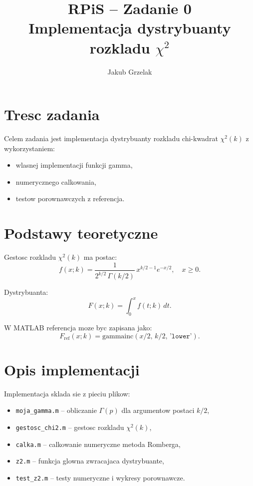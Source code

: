 \documentclass[12pt,a4paper]{article}
\title{RPiS -- Zadanie 0\\Implementacja dystrybuanty rozkladu $\chi^2$}
\author{Jakub Grzelak}
\begin{document}
\maketitle

\section{Tresc zadania}
Celem zadania jest implementacja dystrybuanty rozkladu chi-kwadrat $\chi^2(k)$
z wykorzystaniem:
\begin{itemize}
  \item wlasnej implementacji funkcji gamma,
  \item numerycznego calkowania,
  \item testow porownawczych z referencja.
\end{itemize}

\section{Podstawy teoretyczne}
Gestosc rozkladu $\chi^2(k)$ ma postac:
\begin{equation}
  f(x;k) = \frac{1}{2^{k/2}\,\Gamma(k/2)}\,x^{k/2-1}e^{-x/2}, \quad x \ge 0.
\end{equation}

Dystrybuanta:
\begin{equation}
  F(x;k) = \int_0^x f(t;k)\,dt.
\end{equation}

W MATLAB referencja moze byc zapisana jako:
\begin{equation}
  F_{\text{ref}}(x;k) = \mathrm{gammainc}(x/2,\,k/2,\,\texttt{'lower'}).
\end{equation}

\section{Opis implementacji}
Implementacja sklada sie z pieciu plikow:
\begin{itemize}
  \item \texttt{moja\_gamma.m} -- obliczanie $\Gamma(p)$ dla argumentow postaci $k/2$,
  \item \texttt{gestosc\_chi2.m} -- gestosc rozkladu $\chi^2(k)$,
  \item \texttt{calka.m} -- calkowanie numeryczne metoda Romberga,
  \item \texttt{z2.m} -- funkcja glowna zwracajaca dystrybuante,
  \item \texttt{test\_z2.m} -- testy numeryczne i wykresy porownawcze.
\end{itemize}
\end{document}
